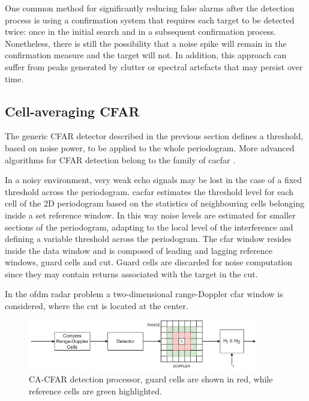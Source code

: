 			
			One common method for significantly reducing false alarms after the detection process is using a confirmation system that requires each target to be detected twice: once in the initial search and in a subsequent confirmation process.
			Nonetheless, there is still the possibility that a noise spike will remain in the confirmation measure and the target will not. In addition, this approach can suffer from peaks generated by clutter or spectral artefacts that may persist over time.

		\subsection{Cell-averaging CFAR}
		\label{sec:cell averaging CFAR}

The generic CFAR detector described in the previous section defines a threshold, based on noise power, to be applied to the whole periodogram. More advanced algorithms for CFAR detection belong to the family of \gls{cacfar} \cite{Richards_2014}.

In a noisy environment, very weak echo signals may be lost in the case of a fixed threshold across the periodogram. \gls{cacfar} estimates the threshold level for each cell of the 2D periodogram based on the statistics of neighbouring cells belonging inside a set reference window. In this way noise levels are estimated for smaller sections of the periodogram, adapting to the local level of the interference and defining a variable threshold across the periodogram.
The \gls{cfar} window resides inside the data window and is composed of leading and lagging reference windows, guard cells and \gls{cut}. Guard cells are discarded for noise computation since they may contain returns associated with the target in the \gls{cut}.

In the \gls{ofdm} radar problem a two-dimensional range-Doppler \gls{cfar} window is considered, where the \gls{cut} is located at the center.

\begin{figure}[H]
	\centering
	\includegraphics[width=0.9\textwidth]{Images/radar_detect_threshold/cacfar_pipeline.png}
	\caption{CA-CFAR detection processor, guard cells are shown in red, while reference cells are green highlighted.}
	\label{fig:cacfar_pipeline}
\end{figure}


